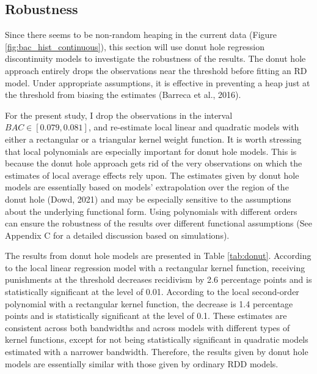 \documentclass[
  11pt,
]{article}
\begin{document}
\hypertarget{robustness}{%
\subsection{Robustness}\label{robustness}}

Since there seems to be non-random heaping in the current data (Figure
\ref{fig:bac_hist_continuous}), this section will use donut hole
regression discontinuity models to investigate the robustness of the
results. The donut hole approach entirely drops the observations near
the threshold before fitting an RD model. Under appropriate assumptions,
it is effective in preventing a heap just at the threshold from biasing
the estimates (Barreca et al., 2016).

For the present study, I drop the observations in the interval
\(BAC \in [0.079, 0.081]\), and re-estimate local linear and quadratic
models with either a rectangular or a triangular kernel weight function.
It is worth stressing that local polynomials are especially important
for donut hole models. This is because the donut hole approach gets rid
of the very observations on which the estimates of local average effects
rely upon. The estimates given by donut hole models are essentially
based on models' extrapolation over the region of the donut hole (Dowd,
2021) and may be especially sensitive to the assumptions about the
underlying functional form. Using polynomials with different orders can
ensure the robustness of the results over different functional
assumptions (See Appendix C for a detailed discussion based on
simulations).

The results from donut hole models are presented in Table
\ref{tab:donut}. According to the local linear regression model with a
rectangular kernel function, receiving punishments at the threshold
decreases recidivism by 2.6 percentage points and is statistically
significant at the level of 0.01. According to the local second-order
polynomial with a rectangular kernel function, the decrease is 1.4
percentage points and is statistically significant at the level of 0.1.
These estimates are consistent across both bandwidths and across models
with different types of kernel functions, except for not being
statistically significant in quadratic models estimated with a narrower
bandwidth. Therefore, the results given by donut hole models are
essentially similar with those given by ordinary RDD models.

\begingroup
\renewcommand{\arraystretch}{1.1}
\end{document}
